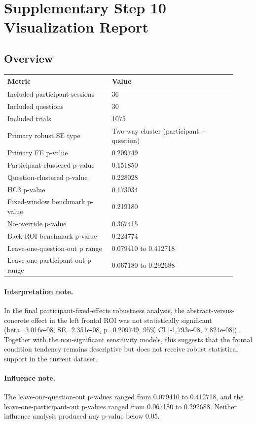 \documentclass[11pt]{article}
\begin{document}
\section*{Supplementary Step 10 Visualization Report}
\subsection*{Overview}
\begin{tabular}{p{0.42\linewidth}p{0.50\linewidth}}
\toprule
Metric & Value\\
\midrule
Included participant-sessions & 36\\
Included questions & 30\\
Included trials & 1075\\
Primary robust SE type & Two-way cluster (participant + question)\\
Primary FE p-value & 0.209749\\
Participant-clustered p-value & 0.151850\\
Question-clustered p-value & 0.228028\\
HC3 p-value & 0.173034\\
Fixed-window benchmark p-value & 0.219180\\
No-override p-value & 0.367415\\
Back ROI benchmark p-value & 0.224774\\
Leave-one-question-out p range & 0.079410 to 0.412718\\
Leave-one-participant-out p range & 0.067180 to 0.292688\\
\bottomrule
\end{tabular}
\paragraph{Interpretation note.} In the final participant-fixed-effects robustness analysis, the abstract-versus-concrete effect in the left frontal ROI was not statistically significant (beta=3.016e-08, SE=2.351e-08, p=0.209749, 95\% CI [-1.793e-08, 7.824e-08]). Together with the non-significant sensitivity models, this suggests that the frontal condition tendency remains descriptive but does not receive robust statistical support in the current dataset.
\paragraph{Influence note.} The leave-one-question-out p-values ranged from 0.079410 to 0.412718, and the leave-one-participant-out p-values ranged from 0.067180 to 0.292688. Neither influence analysis produced any p-value below 0.05.
\end{document}

